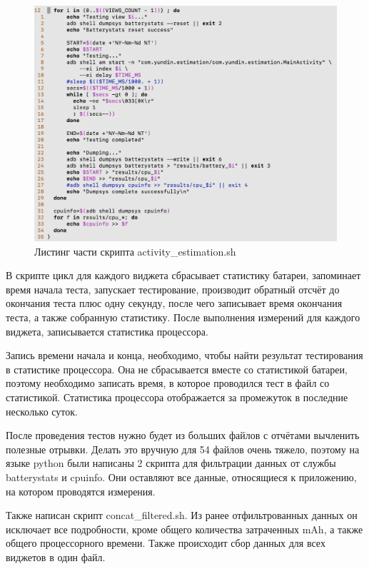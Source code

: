 \documentclass[a4paper,14pt]{extarticle} %
\begin{document}
	\begin{figure}[tbh]
		\includegraphics[width=\textwidth]{activity_estimation}
		\caption{Листинг части скрипта activity\_estimation.sh}
		\label{fig:activity_estimation}
	\end{figure}

	В скрипте цикл для каждого виджета сбрасывает статистику батареи, запоминает время начала теста, запускает тестирование, производит обратный отсчёт до окончания теста плюс одну секунду, после чего записывает время окончания теста, а также собранную статистику. После выполнения измерений для каждого виджета, записывается статистика процессора.
	
	Запись времени начала и конца, необходимо, чтобы найти результат тестирования в статистике процессора. Она не сбрасывается вместе со статистикой батареи, поэтому необходимо записать время, в которое проводился тест в файл со статистикой. Статистика процессора отображается за промежуток в последние несколько суток.
	
	После проведения тестов нужно будет из больших файлов с отчётами вычленить полезные отрывки. Делать это вручную для 54 файлов очень тяжело, поэтому на языке python были написаны 2 скрипта для фильтрации данных от службы batterystats и cpuinfo. Они оставляют все данные, относящиеся к приложению, на котором проводятся измерения.
	
	Также написан скрипт concat\_filtered.sh. Из ранее отфильтрованных данных он исключает все подробности, кроме общего количества затраченных mAh, а также общего процессорного времени. Также происходит сбор данных для всех виджетов в один файл.
	
\end{document}
